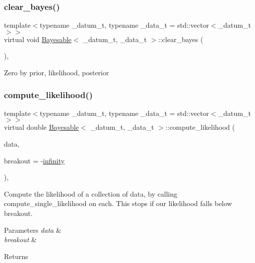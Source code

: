 \subsubsection{\texorpdfstring{clear\+\_\+bayes()}{clear\_bayes()}}
{\footnotesize\ttfamily template$<$typename \+\_\+datum\+\_\+t, typename \+\_\+data\+\_\+t = std\+::vector$<$\+\_\+datum\+\_\+t$>$$>$ \\
virtual void \hyperlink{class_bayesable}{Bayesable}$<$ \+\_\+datum\+\_\+t, \+\_\+data\+\_\+t $>$\+::clear\+\_\+bayes (\begin{DoxyParamCaption}{ }\end{DoxyParamCaption})\hspace{0.3cm}{\ttfamily [inline]}, {\ttfamily [virtual]}}

Zero by prior, likelihood, posterior\mbox{\label{class_bayesable_a202493156cec15937bee304d807fdbdb}} 
\subsubsection{\texorpdfstring{compute\+\_\+likelihood()}{compute\_likelihood()}}
{\footnotesize\ttfamily template$<$typename \+\_\+datum\+\_\+t, typename \+\_\+data\+\_\+t = std\+::vector$<$\+\_\+datum\+\_\+t$>$$>$ \\
virtual double \hyperlink{class_bayesable}{Bayesable}$<$ \+\_\+datum\+\_\+t, \+\_\+data\+\_\+t $>$\+::compute\+\_\+likelihood (\begin{DoxyParamCaption}\item[{const \hyperlink{class_bayesable_aa2788c4d7718c0a824e1d28c4c98f921}{data\+\_\+t} \&}]{data,  }\item[{const double}]{breakout = {\ttfamily -\/\hyperlink{_numerics_8h_af9434aea82baf2f6a5d9b6f9e36db08e}{infinity}} }\end{DoxyParamCaption})\hspace{0.3cm}{\ttfamily [inline]}, {\ttfamily [virtual]}}



Compute the likelihood of a collection of data, by calling compute\+\_\+single\+\_\+likelihood on each. This stops if our likelihood falls below breakout. 


\begin{DoxyParams}{Parameters}
{\em data} & \\
\hline
{\em breakout} & \\
\hline
\end{DoxyParams}
\begin{DoxyReturn}{Returns}

\end{DoxyReturn}


